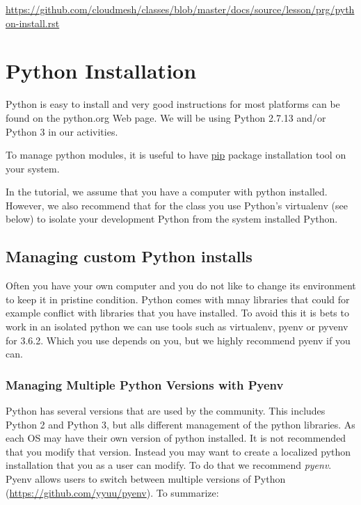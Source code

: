 \begin{fileremark}\url{https://github.com/cloudmesh/classes/blob/master/docs/source/lesson/prg/python-install.rst}\end{fileremark}
\section{Python Installation}\label{python-installation}

Python is easy to install and very good instructions for most platforms
can be found on the python.org Web page. We will be using Python 2.7.13
and/or Python 3 in our activities.

To manage python modules, it is useful to have
\href{https://pypi.python.org/pypi/pip}{pip} package installation tool
on your system.

In the tutorial, we assume that you have a computer with python
installed. However, we also recommend that for the class you use
Python's virtualenv (see below) to isolate your development Python from
the system installed Python.

\subsection{Managing custom Python
installs}\label{managing-custom-python-installs}

Often you have your own computer and you do not like to change its
environment to keep it in pristine condition. Python comes with mnay
libraries that could for example conflict with libraries that you have
installed. To avoid this it is bets to work in an isolated python we can
use tools such as virtualenv, pyenv or pyvenv for 3.6.2. Which you use
depends on you, but we highly recommend pyenv if you can.

\subsubsection{Managing Multiple Python Versions with
Pyenv}\label{managing-multiple-python-versions-with-pyenv}

Python has several versions that are used by the community. This
includes Python 2 and Python 3, but alls different management of the
python libraries. As each OS may have their own version of python
installed. It is not recommended that you modify that version. Instead
you may want to create a localized python installation that you as a
user can modify. To do that we recommend \emph{pyenv}. Pyenv allows
users to switch between multiple versions of Python
(\url{https://github.com/yyuu/pyenv}). To summarize:

